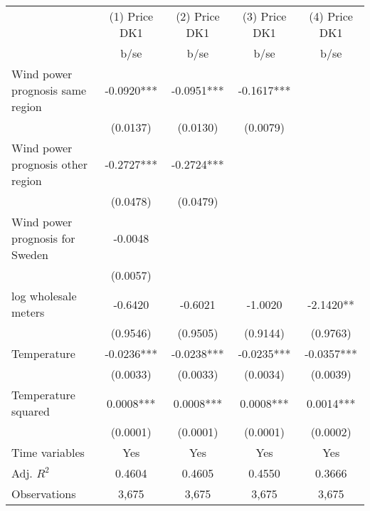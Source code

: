 \begin{tabular}{lcccc}\toprule
                    &(1) Price DK1   &(2) Price DK1   &(3) Price DK1   &(4) Price DK1   \\
                    &        b/se   &        b/se   &        b/se   &        b/se   \\
\midrule
Wind power prognosis same region&     -0.0920***&     -0.0951***&     -0.1617***&               \\
                    &    (0.0137)   &    (0.0130)   &    (0.0079)   &               \\
Wind power prognosis other region&     -0.2727***&     -0.2724***&               &               \\
                    &    (0.0478)   &    (0.0479)   &               &               \\
Wind power prognosis for Sweden&     -0.0048   &               &               &               \\
                    &    (0.0057)   &               &               &               \\
log wholesale meters&     -0.6420   &     -0.6021   &     -1.0020   &     -2.1420** \\
                    &    (0.9546)   &    (0.9505)   &    (0.9144)   &    (0.9763)   \\
Temperature         &     -0.0236***&     -0.0238***&     -0.0235***&     -0.0357***\\
                    &    (0.0033)   &    (0.0033)   &    (0.0034)   &    (0.0039)   \\
Temperature squared &      0.0008***&      0.0008***&      0.0008***&      0.0014***\\
                    &    (0.0001)   &    (0.0001)   &    (0.0001)   &    (0.0002)   \\
Time variables      &         Yes   &         Yes   &         Yes   &         Yes   \\
\midrule
Adj. \(R^2\)        &      0.4604   &      0.4605   &      0.4550   &      0.3666   \\
Observations        &       3,675   &       3,675   &       3,675   &       3,675   \\
\bottomrule\end{tabular}
